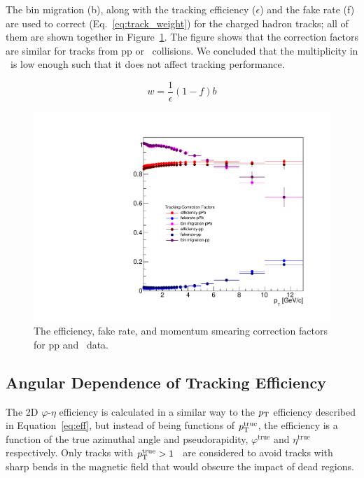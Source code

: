 The bin migration (b), along with the tracking efficiency ($\epsilon$) and the fake rate (f) are used to correct (Eq.~\ref{eq:track_weight}) for the charged hadron tracks; all of them are shown together in Figure~\ref{fig:correctionFactors}. The figure shows that the correction factors are similar for tracks from pp or \pPb~collisions. We concluded that the multiplicity in \pPb~is low enough such that it does not affect tracking performance.  

\begin{equation}\label{eq:track_weight}
w = \frac{1}{\epsilon}(1-f)b
\end{equation}

\begin{figure}[h]
\center
\includegraphics[width=.7\textwidth]{Data_Analysis/Tracking/trackCorrectionFactors_pPbAndpp.pdf}
\caption{The efficiency, fake rate, and momentum smearing correction factors for pp and \pPb~data.}
\label{fig:correctionFactors}
\end{figure}

\FloatBarrier

\subsection{Angular Dependence of Tracking Efficiency}
The 2D $\varphi$-$\eta$ efficiency is calculated in a similar way to the $p_{\mathrm{T}}$ efficiency described in Equation~\ref{eq:eff}, but instead of being functions of $p_{\mathrm{T}}^{\mathrm{true}}$, the efficiency is a function of the true azimuthal angle and pseudorapidity, $\varphi^{\mathrm{true}}$ and $\eta^{\mathrm{true}}$ respectively. Only tracks with {$p_{\mathrm{T}}^{\mathrm{true}}>1$} \GeVc~are considered to avoid tracks with sharp bends in the magnetic field that would obscure the impact of dead regions.

